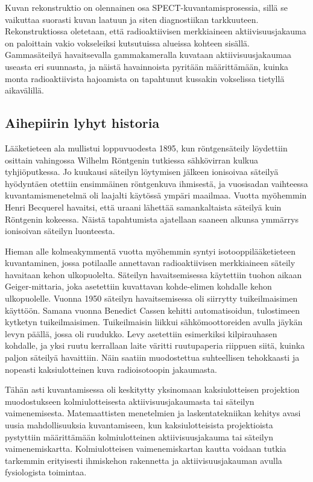 Kuvan rekonstruktio on olennainen osa SPECT-kuvantamisprosessia, sillä se vaikuttaa suorasti kuvan laatuun ja siten diagnostiikan tarkkuuteen\cite{slomka_novel_2022}. Rekonstruktiossa oletetaan, että radioaktiivisen merkkiaineen aktiivisuusjakauma on paloittain vakio vokseleiksi kutsutuissa alueissa kohteen sisällä. Gammasäteilyä havaitsevalla gammakameralla kuvataan aktiivisuusjakaumaa useasta eri suunnasta, ja näistä havainnoista pyritään määrittämään, kuinka monta radioaktiivista hajoamista on tapahtunut kussakin vokselissa tietyllä aikavälillä.\cite{bruyant_analytic_2002, slomka_novel_2022}

\subsection{Aihepiirin lyhyt historia}
Lääketieteen ala mullistui loppuvuodesta 1895, kun röntgensäteily löydettiin osittain vahingossa Wilhelm Röntgenin tutkiessa sähkövirran kulkua tyhjiöputkessa. Jo kuukausi säteilyn löytymisen jälkeen ionisoivaa säteilyä hyödyntäen otettiin ensimmäinen röntgenkuva ihmisestä, ja vuosisadan vaihteessa kuvantamismenetelmä oli laajalti käytössä ympäri maailmaa.\cite{bercovich_medical_2018, cherry_basic_2012} Vuotta myöhemmin Henri Becquerel havaitsi, että uraani lähettää samankaltaista säteilyä kuin Röntgenin kokeessa. Näistä tapahtumista ajatellaan saaneen alkunsa ymmärrys ionisoivan säteilyn luonteesta.\cite{cherry_basic_2012}

Hieman alle kolmeakymmentä vuotta myöhemmin syntyi isotooppilääketieteen kuvantaminen, jossa potilaalle annettavan radioaktiivisen merkkiaineen säteily havaitaan kehon ulkopuolelta. Säteilyn havaitsemisessa käytettiin tuohon aikaan Geiger-mittaria, joka asetettiin kuvattavan kohde-elimen kohdalle kehon ulkopuolelle. Vuonna 1950 säteilyn havaitsemisessa oli siirrytty tuikeilmaisimen käyttöön. Samana vuonna Benedict Cassen kehitti automatisoidun, tulostimeen kytketyn tuikeilmaisimen. Tuikeilmaisin liikkui sähkömoottoreiden avulla jäykän levyn päällä, jossa oli ruudukko. Levy asetettiin esimerkiksi kilpirauhasen kohdalle, ja yksi ruutu kerrallaan laite väritti ruutupaperia riippuen siitä, kuinka paljon säteilyä havaittiin. Näin saatiin muodostettua suhteellisen tehokkaasti ja nopeasti kaksiulotteinen kuva radioisotoopin jakaumasta.\cite{jaszczak_early_2006, cherry_gamma_2012}

Tähän asti kuvantamisessa oli keskitytty yksinomaan kaksiulotteisen projektion muodostukseen kolmiulotteisesta aktiivisuusjakaumasta tai säteilyn vaimenemisesta. Matemaattisten menetelmien ja laskentatekniikan kehitys avasi uusia mahdollisuuksia kuvantamiseen, kun kaksiulotteisista projektioista pystyttiin määrittämään kolmiulotteinen aktiivisuusjakauma\cite{bercovich_medical_2018, cherry_single_2012} tai säteilyn vaimenemiskartta\cite{bercovich_medical_2018, stiller_basics_2018}. Kolmiulotteisen vaimenemiskartan kautta voidaan tutkia tarkemmin erityisesti ihmiskehon rakennetta ja aktiivisuusjakauman avulla fysiologista toimintaa.

